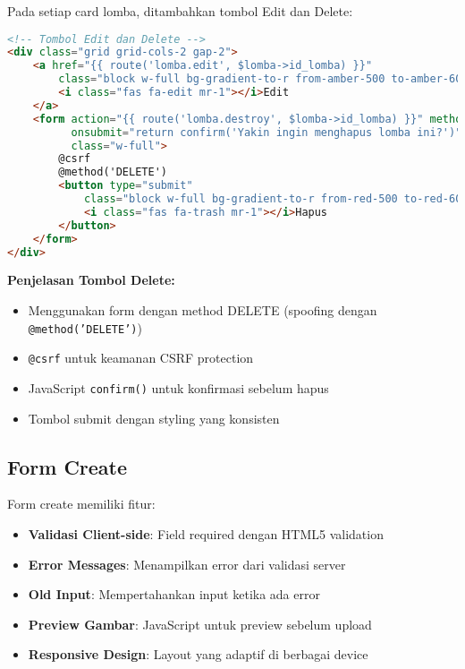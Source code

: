 \documentclass[12pt,a4paper]{article}
\begin{document}
Pada setiap card lomba, ditambahkan tombol Edit dan Delete:

\begin{lstlisting}[language=HTML]
<!-- Tombol Edit dan Delete -->
<div class="grid grid-cols-2 gap-2">
    <a href="{{ route('lomba.edit', $lomba->id_lomba) }}"
        class="block w-full bg-gradient-to-r from-amber-500 to-amber-600 text-white text-center py-2 px-3 rounded-xl hover:from-amber-600 hover:to-amber-700 transition-all text-xs font-bold shadow-lg transform hover:scale-105">
        <i class="fas fa-edit mr-1"></i>Edit
    </a>
    <form action="{{ route('lomba.destroy', $lomba->id_lomba) }}" method="POST" 
          onsubmit="return confirm('Yakin ingin menghapus lomba ini?')" 
          class="w-full">
        @csrf
        @method('DELETE')
        <button type="submit"
            class="block w-full bg-gradient-to-r from-red-500 to-red-600 text-white text-center py-2 px-3 rounded-xl hover:from-red-600 hover:to-red-700 transition-all text-xs font-bold shadow-lg transform hover:scale-105">
            <i class="fas fa-trash mr-1"></i>Hapus
        </button>
    </form>
</div>
\end{lstlisting}

\textbf{Penjelasan Tombol Delete:}
\begin{itemize}
    \item Menggunakan form dengan method DELETE (spoofing dengan \texttt{@method('DELETE')})
    \item \texttt{@csrf} untuk keamanan CSRF protection
    \item JavaScript \texttt{confirm()} untuk konfirmasi sebelum hapus
    \item Tombol submit dengan styling yang konsisten
\end{itemize}

\subsection{Form Create}

Form create memiliki fitur:
\begin{itemize}
    \item \textbf{Validasi Client-side}: Field required dengan HTML5 validation
    \item \textbf{Error Messages}: Menampilkan error dari validasi server
    \item \textbf{Old Input}: Mempertahankan input ketika ada error
    \item \textbf{Preview Gambar}: JavaScript untuk preview sebelum upload
    \item \textbf{Responsive Design}: Layout yang adaptif di berbagai device
\end{itemize}
\end{document}
